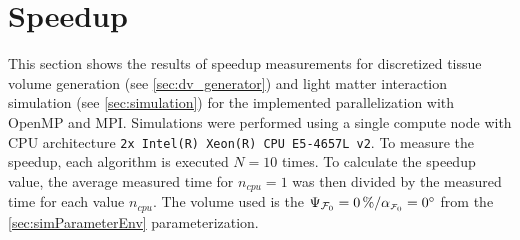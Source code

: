 \section{Speedup}
\label{sec:simSpeedup}
%
This section shows the results of speedup measurements for discretized tissue volume generation (see \cref{sec:dv_generator}) and light matter interaction simulation (see \cref{sec:simulation}) for the implemented parallelization with \ac{OpenMP} and \ac{MPI}.
Simulations were performed using a single compute node with \ac{CPU} architecture \texttt{2x Intel(R) Xeon(R) CPU E5-4657L v2}.
To measure the speedup, each algorithm is executed $N=10$ times.
To calculate the speedup value, the average measured time for $n_\mathit{cpu}=1$ was then divided by the measured time for each value $n_\mathit{cpu}$.
The volume used is the $\modelPsi=\SI{0}{\percent} / \modelInc=\SI{0}{\degree}$ from the \cref{sec:simParameterEnv} parameterization.
%
%
%
